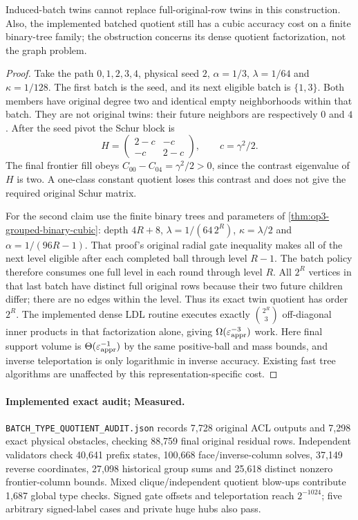 \begin{proposition}
\label{prop:op3-batch-type-limits}
Induced-batch twins cannot replace full-original-row twins in this
construction. Also, the implemented batched quotient still has a cubic
accuracy cost on a finite binary-tree family; the obstruction concerns
its dense quotient factorization, not the graph problem.
\end{proposition}
\begin{proof}
Take the path $0,1,2,3,4$, physical seed $2$, $\alpha=1/3$,
$\lambda=1/64$ and $\kappa=1/128$. The first batch is the seed, and
its next eligible batch is $\{1,3\}$. Both members have original degree
two and identical empty neighborhoods within that batch. They are not
original twins: their future neighbors are respectively $0$ and $4$.
After the seed pivot the Schur block is
\[
 H=\begin{pmatrix}2-c&-c\\-c&2-c\end{pmatrix},\qquad c=\gamma^2/2.
\]
The final frontier fill obeys $C_{00}-C_{04}=\gamma^2/2>0$, since the
contrast eigenvalue of $H$ is two. A one-class constant quotient loses
this contrast and does not give the required original Schur matrix.

For the second claim use the finite binary trees and parameters of
\cref{thm:op3-grouped-binary-cubic}: depth $4R+8$,
$\lambda=1/(64\,2^R)$, $\kappa=\lambda/2$ and
$\alpha=1/(96R-1)$. That proof's original radial gate inequality makes
all of the next level eligible after each completed ball through level
$R-1$. The batch policy therefore consumes one full level in each round
through level $R$. All $2^R$ vertices in that last batch have distinct
full original rows because their two future children differ; there are
no edges within the level. Thus its exact twin quotient has order $2^R$.
The implemented dense LDL routine executes exactly $\binom{2^R}{3}$
off-diagonal inner products in that factorization alone, giving
$\Omega(\varepsilon_{\mathrm{appr}}^{-3})$ work. Here final support volume is
$\Theta(\varepsilon_{\mathrm{appr}}^{-1})$ by the same positive-ball and mass bounds, and
inverse teleportation is only logarithmic in inverse accuracy. Existing
fast tree algorithms are unaffected by this representation-specific cost.
\end{proof}

\paragraph{Implemented exact audit; Measured.}
\texttt{BATCH\_TYPE\_QUOTIENT\_AUDIT.json} records 7,728 original ACL
outputs and 7,298 exact physical obstacles, checking 88,759 final original
residual rows. Independent validators check 40,641 prefix states,
100,668 face/inverse-column solves, 37,149 reverse coordinates,
27,098 historical group sums and 25,618 distinct nonzero frontier-column
bounds. Mixed clique/independent quotient blow-ups contribute 1,687
global type checks. Signed gate offsets and teleportation reach $2^{-1024}$;
five arbitrary signed-label cases and private huge hubs also pass.

